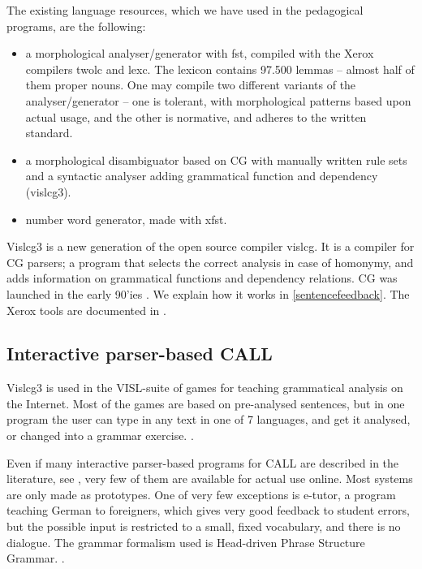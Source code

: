 \documentclass[11pt]{article}
\begin{document}
The existing language resources, which we have used in the pedagogical programs, are the following:

\begin{itemize}
\item a morphological analyser/generator with fst, compiled with the Xerox compilers twolc and lexc.  The lexicon contains 97.500 lemmas -- almost half of them proper nouns. One may compile two different variants of the analyser/generator -- one is tolerant, with morphological patterns based upon actual usage, and the other is normative, and adheres to the written standard. 
\item a morphological disambiguator based on CG with manually written rule sets and a syntactic analyser adding grammatical function and dependency (vislcg3). 
\item number word generator, made with xfst.
\end{itemize}

Vislcg3 is a new generation of the open source compiler vislcg. It is a compiler for CG parsers; a program that selects the correct analysis in case of homonymy, and adds information on grammatical functions and dependency relations. CG was launched in the early 90'ies \cite{Karlsson:95}. We explain how it works in \ref{sentencefeedback}. The Xerox tools are documented in \cite{BeesleyKarttunen:03}. 

\subsection{Interactive parser-based CALL}

Vislcg3 is used in the VISL-suite of games for teaching grammatical analysis on the Internet. Most of the games are based on pre-analysed sentences, but in one program the user can type in any text in one of 7 languages, and get it analysed, or changed into a grammar exercise. \cite{Bick:05}.

Even if many interactive parser-based programs for CALL are described in the literature, see \cite{Gamper:02,Heift:07}, very few of them are available for actual use online. Most systems are only made as prototypes. One of very few exceptions is e-tutor, a program teaching German to foreigners, which gives very good feedback to student errors, but the possible input is restricted to a small, fixed vocabulary, and there is no dialogue. The grammar formalism used is Head-driven Phrase Structure Grammar. \cite{Heift:01,Heift:02}.
\end{document}
